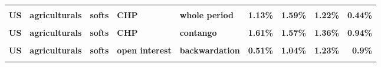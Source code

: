 \documentclass[
  authoryear,
  preprint,
  3p]{elsarticle}
\begin{document}
\begin{landscape}
\begin{longtable}[t]{>{}l>{}l>{}l>{}l>{}l>{}r>{}r>{}r>{}r}
\textbf{\cellcolor{gray!10}{US}} & \textbf{\cellcolor{gray!10}{agriculturals}} & \textbf{\cellcolor{gray!10}{softs}} & \textbf{\cellcolor{gray!10}{market}} & \textbf{\cellcolor{gray!10}{contango}} & \textcolor[HTML]{4285f4}{\textbf{\cellcolor{gray!10}{3.87\%}}} & \textcolor[HTML]{4285f4}{\textbf{\cellcolor{gray!10}{9.02\%}}} & \textcolor[HTML]{4285f4}{\textbf{\cellcolor{gray!10}{21.64\%}}} & \textcolor[HTML]{4285f4}{\textbf{\cellcolor{gray!10}{8.6\%}}}\\
\textbf{US} & \textbf{agriculturals} & \textbf{softs} & \textbf{CHP} & \textbf{whole period} & \textcolor[HTML]{4285f4}{\textbf{1.13\%}} & \textcolor[HTML]{4285f4}{\textbf{1.59\%}} & \textcolor[HTML]{4285f4}{\textbf{1.22\%}} & \textcolor[HTML]{4285f4}{\textbf{0.44\%}}\\
\textbf{\cellcolor{gray!10}{US}} & \textbf{\cellcolor{gray!10}{agriculturals}} & \textbf{\cellcolor{gray!10}{softs}} & \textbf{\cellcolor{gray!10}{CHP}} & \textbf{\cellcolor{gray!10}{backwardation}} & \textcolor[HTML]{4285f4}{\textbf{\cellcolor{gray!10}{1.11\%}}} & \textcolor[HTML]{4285f4}{\textbf{\cellcolor{gray!10}{2.07\%}}} & \textcolor[HTML]{4285f4}{\textbf{\cellcolor{gray!10}{1.49\%}}} & \textcolor[HTML]{4285f4}{\textbf{\cellcolor{gray!10}{1.35\%}}}\\
\addlinespace
\textbf{US} & \textbf{agriculturals} & \textbf{softs} & \textbf{CHP} & \textbf{contango} & \textcolor[HTML]{4285f4}{\textbf{1.61\%}} & \textcolor[HTML]{4285f4}{\textbf{1.57\%}} & \textcolor[HTML]{4285f4}{\textbf{1.36\%}} & \textcolor[HTML]{4285f4}{\textbf{0.94\%}}\\
\textbf{\cellcolor{gray!10}{US}} & \textbf{\cellcolor{gray!10}{agriculturals}} & \textbf{\cellcolor{gray!10}{softs}} & \textbf{\cellcolor{gray!10}{open interest}} & \textbf{\cellcolor{gray!10}{whole period}} & \textcolor[HTML]{4285f4}{\textbf{\cellcolor{gray!10}{0.29\%}}} & \textcolor[HTML]{4285f4}{\textbf{\cellcolor{gray!10}{0.28\%}}} & \textcolor[HTML]{4285f4}{\textbf{\cellcolor{gray!10}{0.36\%}}} & \textcolor[HTML]{4285f4}{\textbf{\cellcolor{gray!10}{0.28\%}}}\\
\textbf{US} & \textbf{agriculturals} & \textbf{softs} & \textbf{open interest} & \textbf{backwardation} & \textcolor[HTML]{4285f4}{\textbf{0.51\%}} & \textcolor[HTML]{4285f4}{\textbf{1.04\%}} & \textcolor[HTML]{4285f4}{\textbf{1.23\%}} & \textcolor[HTML]{4285f4}{\textbf{0.9\%}}\\
\textbf{\cellcolor{gray!10}{US}} & \textbf{\cellcolor{gray!10}{agriculturals}} & \textbf{\cellcolor{gray!10}{softs}} & \textbf{\cellcolor{gray!10}{open interest}} & \textbf{\cellcolor{gray!10}{contango}} & \textcolor[HTML]{4285f4}{\textbf{\cellcolor{gray!10}{0.4\%}}} & \textcolor[HTML]{4285f4}{\textbf{\cellcolor{gray!10}{0.35\%}}} & \textcolor[HTML]{4285f4}{\textbf{\cellcolor{gray!10}{0.66\%}}} & \textcolor[HTML]{4285f4}{\textbf{\cellcolor{gray!10}{0.3\%}}}\\

\end{longtable}
\end{landscape}
\end{document}
